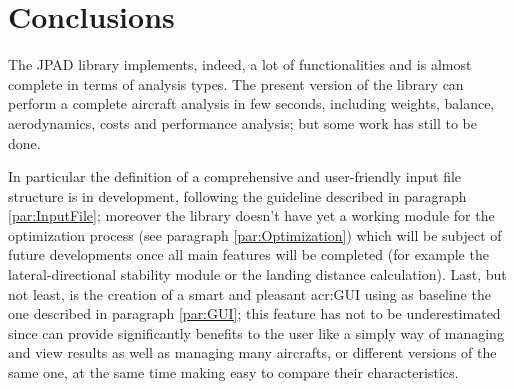 %
%
\chapter*{Conclusions}
%
The \gls{JPAD} library implements, indeed, a lot of functionalities and is almost complete in terms of analysis types. The present version of the library can perform a complete aircraft analysis in few seconds, including weights, balance, aerodynamics, costs and performance analysis; but some work has still to be done. 

\bigskip
\noindent
In particular the definition of a comprehensive and user-friendly input file structure is in development, following the guideline described in paragraph \ref{par:InputFile}; moreover the library doesn't have yet a working module for the optimization process (see paragraph \ref{par:Optimization}) which will be subject of future developments once all main features will be completed (for example the lateral-directional stability module or the landing distance calculation). Last, but not least, is the creation of a smart and pleasant \gls{acr:GUI} using as baseline the one described in paragraph \ref{par:GUI}; this feature has not to be underestimated since can provide significantly benefits to the user like a simply way of managing and view results as well as managing many aircrafts, or different versions of the same one, at the same time making easy to compare their characteristics.


